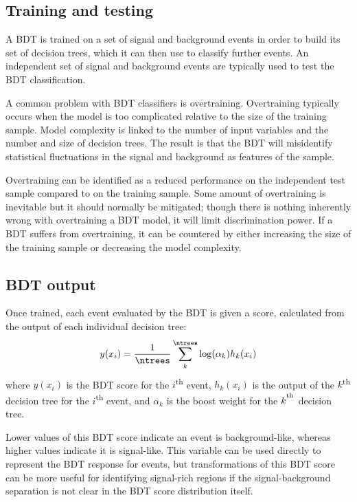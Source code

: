 \subsection{Training and testing}

A \ac{BDT} is trained on a set of signal and background events in order to build
its set of decision trees, which it can then use to classify further events.
An independent set of signal and background events are typically used to test
the \ac{BDT} classification.

A common problem with \ac{BDT} classifiers is overtraining. Overtraining
typically occurs when the model is too complicated relative to the size of the
training sample. Model complexity is linked to the number of input variables and
the number and size of decision trees.
The result is that the \ac{BDT} will misidentify statistical fluctuations
in the signal and background as features of the sample.

Overtraining can be identified as a reduced performance on the independent
test sample compared to on the training sample. Some amount of overtraining is
inevitable but it should normally be mitigated; though there is nothing
inherently wrong with overtraining a \ac{BDT} model, it will limit
discrimination power. If a \ac{BDT} suffers from overtraining, it can be
countered by either increasing the size of the training sample or decreasing the
model complexity.

\subsection{BDT output}

Once trained, each event evaluated by the \ac{BDT} is given a score,
calculated from the output of each individual decision tree:
\begin{equation*}
  y(x_i) = \frac1{\ntrees} \sum_k^{\ntrees} \log(\alpha_k)h_k(x_i)
\end{equation*}
where $y(x_i)$ is the \ac{BDT} score for the $i$\textsuperscript{th} event,
$h_k(x_i)$ is the output of the $k$\textsuperscript{th} decision tree for the
$i$\textsuperscript{th} event, and $\alpha_k$ is the boost weight for the
$k^\textsuperscript{th}$ decision tree.

Lower values of this \ac{BDT} score indicate an event is background-like,
whereas higher values indicate it is signal-like. This variable can be used
directly to represent the \ac{BDT} response for events, but
transformations of this \ac{BDT} score can be more useful for identifying
signal-rich regions if the signal-background separation is not clear in the
\ac{BDT} score distribution itself.

